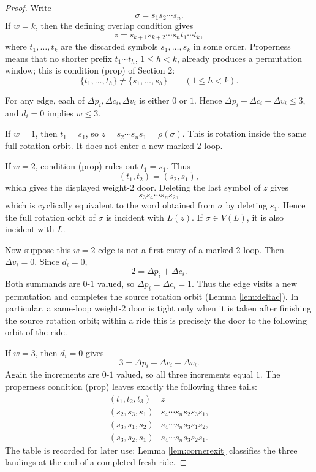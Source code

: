 \documentclass[11pt]{article}
\begin{document}
\begin{proof}
Write
\[
  \sigma=s_1s_2\cdots s_n .
\]
If \(w=k\), then the defining overlap condition gives
\[
  z=s_{k+1}s_{k+2}\cdots s_n t_1\cdots t_k,
\]
where \(t_1,\ldots,t_k\) are the discarded symbols \(s_1,\ldots,s_k\) in some order.  Properness
means that no shorter prefix \(t_1\cdots t_h\), \(1\le h<k\), already produces a permutation
window; this is condition (prop) of Section 2:
\[
  \{t_1,\ldots,t_h\}\ne \{s_1,\ldots,s_h\}\qquad(1\le h<k).
\]

For any edge, each of \(\Delta p_i,\Delta c_i,\Delta v_i\) is either \(0\) or \(1\).  Hence
\(\Delta p_i+\Delta c_i+\Delta v_i\le3\), and \(d_i=0\) implies \(w\le3\).

If \(w=1\), then \(t_1=s_1\), so \(z=s_2\cdots s_ns_1=\rho(\sigma)\).  This is rotation inside
the same full rotation orbit.  It does not enter a new marked \(2\)-loop.

If \(w=2\), condition (prop) rules out \(t_1=s_1\).  Thus
\[
  (t_1,t_2)=(s_2,s_1),
\]
which gives the displayed weight-\(2\) door.  Deleting the last symbol of \(z\) gives
\[
  s_3s_4\cdots s_ns_2,
\]
which is cyclically equivalent to the word obtained from \(\sigma\) by deleting \(s_1\).  Hence
the full rotation orbit of \(\sigma\) is incident with \(L(z)\).  If \(\sigma\in V(L)\), it is
also incident with \(L\).

Now suppose this \(w=2\) edge is not a first entry of a marked \(2\)-loop.  Then \(\Delta v_i=0\).
Since \(d_i=0\),
\[
  2=\Delta p_i+\Delta c_i.
\]
Both summands are \(0\)-\(1\) valued, so \(\Delta p_i=\Delta c_i=1\).  Thus the edge visits a new
permutation and completes the source rotation orbit (Lemma \ref{lem:deltac}).  In particular, a
same-loop weight-\(2\) door is tight only when it is taken after finishing the source rotation
orbit; within a ride this is precisely the door to the following orbit of the ride.

If \(w=3\), then \(d_i=0\) gives
\[
  3=\Delta p_i+\Delta c_i+\Delta v_i.
\]
Again the increments are \(0\)-\(1\) valued, so all three increments equal \(1\).  The properness
condition (prop) leaves exactly the following three tails:
\[
\begin{array}{c|c}
(t_1,t_2,t_3) & z\\ \hline
(s_2,s_3,s_1) & s_4\cdots s_ns_2s_3s_1,\\
(s_3,s_1,s_2) & s_4\cdots s_ns_3s_1s_2,\\
(s_3,s_2,s_1) & s_4\cdots s_ns_3s_2s_1 .
\end{array}
\]
The table is recorded for later use: Lemma \ref{lem:cornerexit} classifies the three landings at
the end of a completed fresh ride.
\end{proof}
\end{document}
